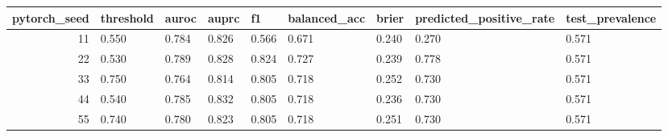 \begin{tabular}{rllllllll}
\toprule
pytorch_seed & threshold & auroc & auprc & f1 & balanced_acc & brier & predicted_positive_rate & test_prevalence \\
\midrule
11 & 0.550 & 0.784 & 0.826 & 0.566 & 0.671 & 0.240 & 0.270 & 0.571 \\
22 & 0.530 & 0.789 & 0.828 & 0.824 & 0.727 & 0.239 & 0.778 & 0.571 \\
33 & 0.750 & 0.764 & 0.814 & 0.805 & 0.718 & 0.252 & 0.730 & 0.571 \\
44 & 0.540 & 0.785 & 0.832 & 0.805 & 0.718 & 0.236 & 0.730 & 0.571 \\
55 & 0.740 & 0.780 & 0.823 & 0.805 & 0.718 & 0.251 & 0.730 & 0.571 \\
\bottomrule
\end{tabular}
